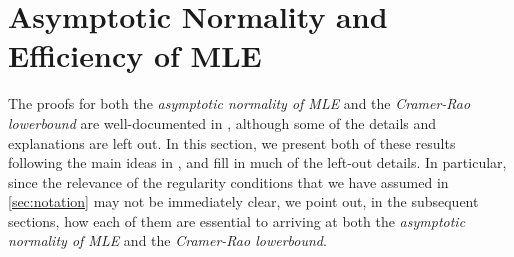 
\section{Asymptotic Normality and Efficiency of MLE}
The proofs for both the \emph{asymptotic normality of MLE} and the \emph{Cramer-Rao lowerbound} are well-documented in \cite{hogg2005introduction}, although some of the details and explanations are left out. In this section, we present both of these results following the main ideas in \cite{hogg2005introduction}, and fill in much of the left-out details. In particular, since the relevance of the regularity conditions that we have assumed in \cref{sec:notation} may not be immediately clear, we point out, in the subsequent sections, how each of them are essential to arriving at both the \emph{asymptotic normality of MLE} and the \emph{Cramer-Rao lowerbound}.
